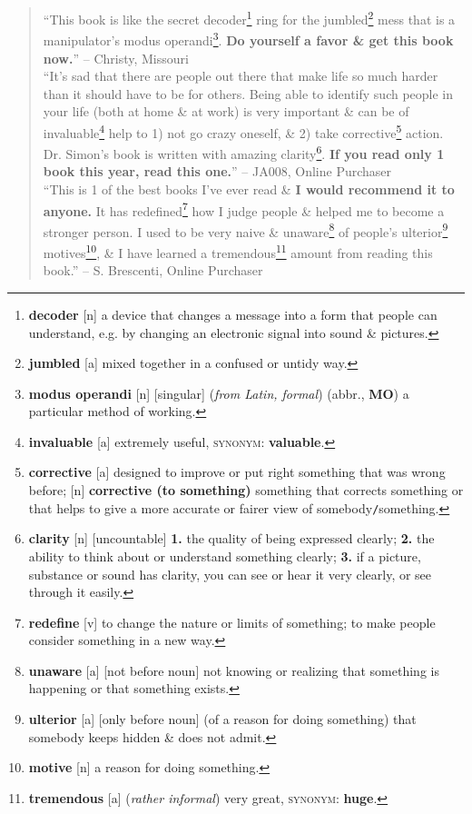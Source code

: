 \documentclass[oneside]{book}
\numberwithin{equation}{section}
\begin{document}
\begin{quotation}
	``This book is like the secret decoder\footnote{\textbf{decoder} [n] a device that changes a message into a form that people can understand, e.g. by changing an electronic signal into sound \& pictures.} ring for the jumbled\footnote{\textbf{jumbled} [a] mixed together in a confused or untidy way.} mess that is a manipulator's modus operandi\footnote{\textbf{modus operandi} [n] [singular] (\textit{from Latin, formal}) (abbr., \textbf{MO}) a particular method of working.}. \textbf{Do yourself a favor \& get this book now.}'' -- Christy, Missouri\\
	
	``It's sad that there are people out there that make life so much harder than it should have to be for others. Being able to identify such people in your life (both at home \& at work) is very important \& can be of invaluable\footnote{\textbf{invaluable} [a] extremely useful, \textsc{synonym}: \textbf{valuable}.} help to 1) not go crazy oneself, \& 2) take corrective\footnote{\textbf{corrective}  [a] designed to improve or put right something that was wrong before; [n] \textbf{corrective (to something)} something that corrects something or that helps to give a more accurate or fairer view of somebody\texttt{/}something.} action. Dr. Simon's book is written with amazing clarity\footnote{\textbf{clarity} [n] [uncountable] \textbf{1.} the quality of being expressed clearly; \textbf{2.} the ability to think about or understand something clearly; \textbf{3.} if a picture, substance or sound has clarity, you can see or hear it very clearly, or see through it easily.}. \textbf{If you read only 1 book this year, read this one.}'' -- JA008, Online Purchaser\\
	
	``This is 1 of the best books I've ever read \& \textbf{I would recommend it to anyone.} It has redefined\footnote{\textbf{redefine} [v] to change the nature or limits of something; to make people consider something in a new way.} how I judge people \& helped me to become a stronger person. I used to be very naive \& unaware\footnote{\textbf{unaware} [a] [not before noun] not knowing or realizing that something is happening or that something exists.} of people's ulterior\footnote{\textbf{ulterior} [a] [only before noun] (of a reason for doing something) that somebody keeps hidden \& does not admit.} motives\footnote{\textbf{motive} [n] a reason for doing something.}, \& I have learned a tremendous\footnote{\textbf{tremendous} [a] (\textit{rather informal}) very great, \textsc{synonym}: \textbf{huge}.} amount from reading this book.'' -- S. Brescenti, Online Purchaser\\
	

\end{quotation}
\end{document}
